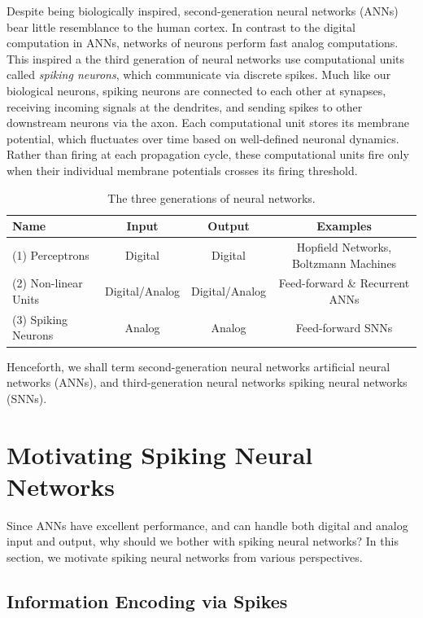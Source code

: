 \documentclass[fyp]{socreport}
\begin{document}
Despite being biologically inspired, second-generation neural networks (ANNs)
bear little resemblance to the human cortex. In contrast to the digital
computation in ANNs, networks of neurons perform fast analog computations. This
inspired a the third generation of neural networks use computational units
called \emph{spiking neurons}, which communicate via discrete spikes. Much like
our biological neurons, spiking neurons are connected to each other at synapses,
receiving incoming signals at the dendrites, and sending spikes to other
downstream neurons via the axon. Each computational unit stores its membrane
potential, which fluctuates over time based on well-defined neuronal dynamics.
Rather than firing at each propagation cycle, these computational units fire
only when their individual membrane potentials crosses its firing threshold.

\begin{table}
  \centering
  \small
  \begin{tabular}{ l|ccc }
    \hline
    \hline
    \textbf{Name} & \textbf{Input} & \textbf{Output} & \textbf{Examples} \\
    \hline
    (1) Perceptrons & Digital & Digital & Hopfield Networks, Boltzmann Machines \\
    (2) Non-linear Units & Digital/Analog & Digital/Analog & Feed-forward \& Recurrent ANNs \\
    (3) Spiking Neurons & Analog & Analog & Feed-forward SNNs \\
    \hline
    \hline
  \end{tabular}
  \normalsize
  \caption{\label{tab:nn_generations} The three generations of neural networks. }
\end{table}

Henceforth, we shall term second-generation neural networks artificial neural
networks (ANNs), and third-generation neural networks spiking neural networks
(SNNs).

\section{Motivating Spiking Neural Networks\label{sec:motiv-spik-neur}}

Since ANNs have excellent performance, and can handle both digital and analog
input and output, why should we bother with spiking neural networks? In this
section, we motivate spiking neural networks from various perspectives.

\subsection{Information Encoding via Spikes}
\end{document}
